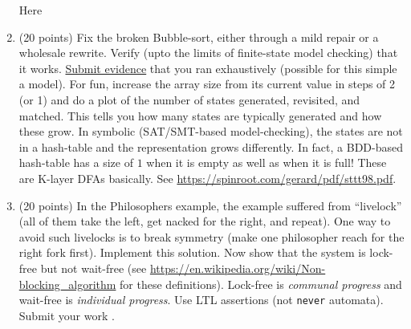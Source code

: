 \documentclass[11pt]{article}
\begin{document}
\begin{enumerate}
\begin{minipage}{\minpagw}
{{      Here
    }%
  }%
\end{minipage}

\clearpage


\item (20 points) Fix the broken Bubble-sort, either through
  a mild repair or a wholesale rewrite.
  Verify (upto the limits of finite-state model checking) that
  it works.
  \underline{Submit evidence} that you ran exhaustively (possible for this simple a model).
    For fun, increase the array size from its current value in steps of 2 (or 1) and do a plot
    of the number of states generated, revisited, and matched. This tells you how many
    states are typically generated and how these grow. In symbolic (SAT/SMT-based model-checking),
    the states are not in a hash-table and the representation grows differently. In fact, a
    BDD-based hash-table has a size of $1$ when it is empty as well as when it is full!
    These are K-layer DFAs basically. See \url{https://spinroot.com/gerard/pdf/sttt98.pdf}.
  
\begin{minipage}{\minpagw}
\end{minipage}

\clearpage

\item (20 points) In the Philosophers example, the example suffered
  from
  ``livelock'' (all of them take the left, get nacked for the right,
  and repeat).
  One way to avoid such livelocks is to break symmetry (make one philosopher
  reach for the right fork first).
  Implement this solution.
  Now show that the system is lock-free but not wait-free
  (see \url{https://en.wikipedia.org/wiki/Non-blocking_algorithm}
  for these definitions).
  Lock-free is {\em communal progress}
  and
  wait-free is {\em individual progress}.
  Use LTL assertions (not {\tt never} automata).
  Submit your work
  .
  
  
\begin{minipage}{\minpagw}
\end{minipage}
\end{enumerate}
\end{document}
